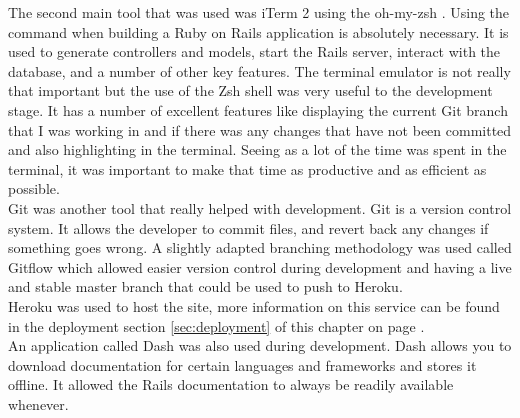 The second main tool that was used was iTerm 2 \citep{iterm:2011} using the oh-my-zsh \citep{zsh:2009}. Using the command when building a Ruby on Rails application is absolutely necessary. It is used to generate controllers and models, start the Rails server, interact with the database, and a number of other key features. The terminal emulator is not really that important but the use of the Zsh shell was very useful to the development stage. It has a number of excellent features like displaying the current Git \citep{git:2014} branch that I was working in and if there was any changes that have not been committed and also highlighting in the terminal. Seeing as a lot of the time was spent in the terminal, it was important to make that time as productive and as efficient as possible.\\

Git was another tool that really helped with development. Git is a version control system. It allows the developer to commit files, and revert back any changes if something goes wrong. A slightly adapted branching methodology was used called Gitflow \citep{gitflow:2010} which allowed easier version control during development and having a live and stable master branch that could be used to push to Heroku.\\

Heroku \citep{heroku:2007} was used to host the site, more information on this service can be found in the deployment section \ref{sec:deployment} of this chapter on page \pageref{sec:deployment}.\\

An application called Dash \citep{dash:2014} was also used during development. Dash allows you to download documentation for certain languages and frameworks and stores it offline. It allowed the Rails documentation to always be readily available whenever.

